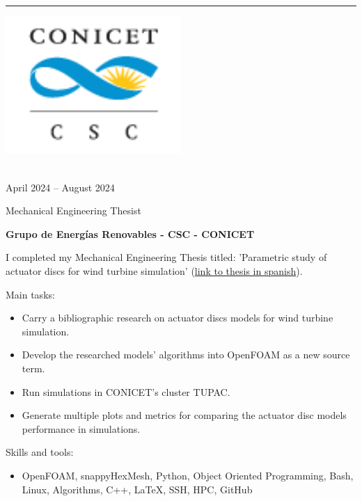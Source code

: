 \documentclass[a4paper,10pt]{article}
\newlength{\cvcolumngapwidth}
\newlength{\cvleftcolumnwidth}
\newlength{\cvrightcolumnwidth}
\newcommand{\cvsectionstyle}[1]{{\normalsize\cvsectionfont\textcolor{cvsectioncolor}{#1}}}
\newcommand{\cvtitlestyle}[1]{{\large\cvtitlefont\textcolor{cvtitlecolor}{#1}}}
\newcommand{\cvdurationstyle}[1]{{\small\cvdurationfont\textcolor{cvdurationcolor}{#1}}}
\newlength{\cvafteritemskipamount}
\newlength{\cvaftersectionskipamount}
\newlength{\cvaftertitleskipamount}
\newlength{\cvparskip}
\newcommand{\cvsection}[1]{
    \begin{minipage}[t]{\cvleftcolumnwidth}
        \raggedleft\cvsectionstyle{#1}
    \end{minipage}%
    \hspace{\cvcolumngapwidth}%
    \begin{minipage}[t]{\cvrightcolumnwidth}
        \textcolor{cvrulecolor}{\rule{\cvrightcolumnwidth}{0.3mm}}
    \end{minipage}

    \vspace{\cvaftersectionskipamount}
}
\newcommand{\cvitem}[2]{
    \begin{minipage}[t]{\cvleftcolumnwidth}
        \raggedleft #1
    \end{minipage}%
    \hspace{\cvcolumngapwidth}%
    \begin{minipage}[t]{\cvrightcolumnwidth}
        \setlength{\parskip}{\cvparskip} #2
    \end{minipage}

    \vspace{\cvafteritemskipamount}
}
\newcommand{\cvtitle}[1]{
    \cvtitlestyle{#1}

    \vspace{\cvaftertitleskipamount}
    \vspace{-\cvparskip}
}
\begin{document}
\cvsection{WORK EXPERIENCE}
\cvitem{
	\begin{minipage}{\textwidth}
    \begin{flushright}
		  \includegraphics[width=0.5\textwidth]{../logos-photos/Logo_CSC.png}   
    \end{flushright}  
  \end{minipage} \\
  \vspace{0.3cm}
  \cvdurationstyle{April 2024 -- August 2024}\\
}{
	
  \cvtitle{Mechanical Engineering Thesist}
  \textbf{\large Grupo de Energías Renovables - CSC - CONICET}

  I completed my Mechanical Engineering Thesis titled: 'Parametric study of actuator discs for wind turbine simulation'
  (\href{https://drive.google.com/file/d/1TWklGPKCdaIwJHuOc-fqAFvFS9hN7_sT/view?usp=sharing}{link to thesis in spanish}).

  Main tasks:
  \begin{itemize}
    \item Carry a bibliographic research on actuator discs models for wind turbine simulation.
    \item Develop the researched models' algorithms into OpenFOAM as a new source term.
    \item Run simulations in CONICET's cluster TUPAC.
    \item Generate multiple plots and metrics for comparing the actuator disc models performance in simulations.
  \end{itemize}

  Skills and tools:
  \begin{itemize}
    \item OpenFOAM, snappyHexMesh, Python, Object Oriented Programming, Bash, Linux, Algorithms,
        C++, LaTeX, SSH, HPC, GitHub
  \end{itemize}
  
}
\end{document}
